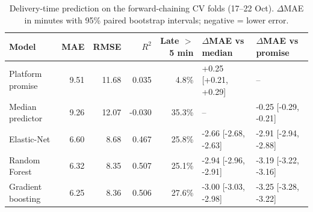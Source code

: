 \begin{table}[t]
\centering
\caption{Delivery-time prediction on the forward-chaining CV folds (17--22 Oct). $\Delta$MAE in minutes with 95\% paired bootstrap intervals; negative = lower error.}
\label{tab:main_results_cv}
\begin{tabular}{lrrrrll}
\toprule
Model & MAE & RMSE & $R^2$ & Late $>$5 min & $\Delta$MAE vs median & $\Delta$MAE vs promise \\
\midrule
Platform promise & 9.51 & 11.68 & 0.035 & 4.8\% & +0.25 [+0.21, +0.29] & -- \\
Median predictor & 9.26 & 12.07 & -0.030 & 35.3\% & -- & -0.25 [-0.29, -0.21] \\
Elastic-Net & 6.60 & 8.68 & 0.467 & 25.8\% & -2.66 [-2.68, -2.63] & -2.91 [-2.94, -2.88] \\
Random Forest & 6.32 & 8.35 & 0.507 & 25.1\% & -2.94 [-2.96, -2.91] & -3.19 [-3.22, -3.16] \\
Gradient boosting & 6.25 & 8.36 & 0.506 & 27.6\% & -3.00 [-3.03, -2.98] & -3.25 [-3.28, -3.22] \\
\bottomrule
\end{tabular}
\end{table}
